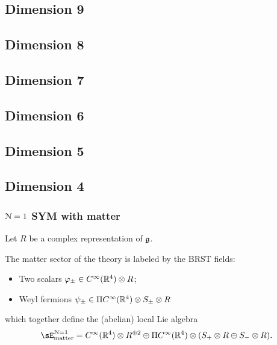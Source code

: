 \documentclass[10pt, oneside]{article}
\begin{document}
\begin{rmk}
\subsection{Dimension 9}


\subsection{Dimension 8}


\subsection{Dimension 7}


\subsection{Dimension 6}



\subsection{Dimension 5}


\subsection{Dimension 4}


\subsubsection{$\mathcal N=1$ SYM with matter} 

Let $R$ be a complex representation of $\mathfrak{g}$.

The matter sector of the theory is labeled by the BRST fields:
\begin{itemize}
\item Two scalars $\varphi_{\pm} \in C^\infty (\mathbb R^4) \otimes R$;
\item Weyl fermions $\psi_{\pm} \in \Pi C^\infty(\mathbb R^4) \otimes S_{\pm} \otimes R$ 
\end{itemize} 
which together define the (abelian) local Lie algebra
\[
\sE_{\rm matter}^{\cN=1} = C^\infty (\RR^4) \otimes R^{\oplus 2} \oplus  \Pi C^\infty(\RR^4) \otimes (S_{+}  \otimes R \oplus S_- \otimes R) .
\]

\end{rmk}
\end{document}

